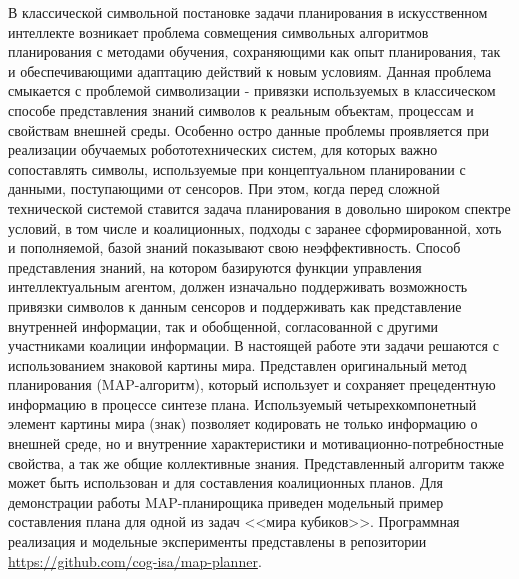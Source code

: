 \documentclass[12pt]{scrartcl}
\begin{document}
	В классической символьной постановке задачи планирования в искусственном интеллекте возникает проблема совмещения символьных алгоритмов планирования с методами обучения, сохраняющими как опыт планирования, так и обеспечивающими адаптацию действий к новым условиям. Данная проблема смыкается с проблемой символизации - привязки используемых в классическом способе представления знаний символов к реальным объектам, процессам и свойствам внешней среды. Особенно остро данные проблемы проявляется при реализации обучаемых робототехнических систем, для которых важно сопоставлять символы, используемые при концептуальном планировании с данными, поступающими от сенсоров. При этом, когда перед сложной технической системой ставится задача планирования в довольно широком спектре условий, в том числе и коалиционных, подходы с заранее сформированной, хоть и пополняемой, базой знаний показывают свою неэффективность. Способ представления знаний, на котором базируются функции управления интеллектуальным агентом, должен изначально поддерживать возможность привязки символов к данным сенсоров и поддерживать как представление внутренней информации, так и обобщенной, согласованной с другими участниками коалиции информации. В настоящей работе эти задачи решаются с использованием знаковой картины мира. Представлен оригинальный метод планирования (MAP-алгоритм), который использует и сохраняет прецедентную информацию в процессе синтезе плана. Используемый четырехкомпонетный элемент картины мира (знак) позволяет кодировать не только информацию о внешней среде, но и внутренние характеристики и мотивационно-потребностные свойства, а так же общие коллективные знания. Представленный алгоритм также может быть использован и для составления коалиционных планов. Для демонстрации работы MAP-планирощика приведен модельный пример составления плана для одной из задач <<мира кубиков>>. Программная реализация и модельные эксперименты представлены в репозитории \href{https://github.com/cog-isa/map-planner}{https://github.com/cog-isa/map-planner}.
	
	\printbibliography
\end{document}
